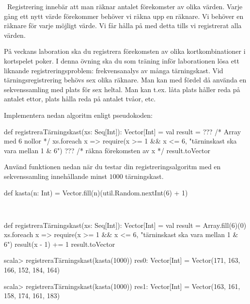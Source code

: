 \QUESTEND





\QUESTBEGIN

\Task \what~Registrering innebär att man räknar antalet förekomster av olika värden. Varje gång ett nytt värde förekommer behöver vi räkna upp en räknare. Vi behöver en räknare för varje möjligt värde. Vi får hålla på med detta tills vi registrerat alla värden.

På veckans laboration ska du registrera förekomsten av olika kortkombinationer i kortspelet poker. I denna övning ska du som träning inför laborationen lösa ett liknande registreringsproblem:  frekvensanalys av många tärningskast. Vid tärningsregistrering behövs sex olika räknare. Man kan med fördel då använda en sekvenssamling med plats för sex heltal. Man kan t.ex. låta  plats  håller reda på antalet ettor, plats  hålla reda på antalet tvåor, etc.

\Subtask Implementera nedan algoritm enligt pseudokoden:
\begin{Code}
def registreraTärningskast(xs: Seq[Int]): Vector[Int] = {
  val result = ??? /* Array med 6 nollor */
  xs.foreach{ x =>
    require(x >= 1 && x <= 6, "tärninskast ska vara mellan 1 & 6")
    ??? /* räkna förekomsten av x */
  }
  result.toVector
}
\end{Code}

\Subtask Använd funktionen  nedan när du testar din registreringsalgoritm med en sekvenssamling innehållande minst $1000$ tärningskast.
\begin{Code}
def kasta(n: Int) = Vector.fill(n)(util.Random.nextInt(6) + 1)
\end{Code}

\SOLUTION

\TaskSolved \what~

\SubtaskSolved
\begin{Code}
def registreraTärningskast(xs: Seq[Int]): Vector[Int] = {
  val result = Array.fill(6)(0)
  xs.foreach{ x =>
    require(x >= 1 && x <= 6, "tärninskast ska vara mellan 1 & 6")
    result(x - 1) += 1
  }
  result.toVector
}
\end{Code}

\SubtaskSolved
\begin{REPL}
scala> registreraTärningskast(kasta(1000))
res0: Vector[Int] = Vector(171, 163, 166, 152, 184, 164)

scala> registreraTärningskast(kasta(1000))
res1: Vector[Int] = Vector(163, 161, 158, 174, 161, 183)
\end{REPL}

